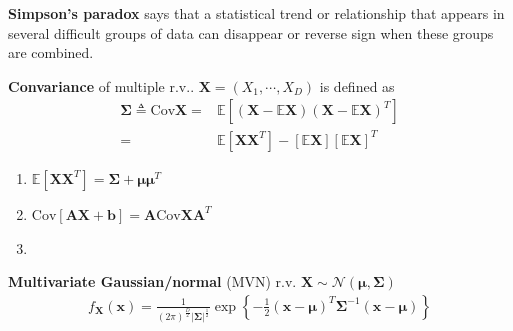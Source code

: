

\textbf{Simpson's paradox} says that a statistical trend or relationship 
that appears in several difficult groups of data can disappear or reverse sign 
when these groups are combined.

\textbf{Convariance} of multiple r.v.. $\bm{X}=(X_1,\cdots,X_D)$ is defined as 
\begin{align}
    \bm{\Sigma}\triangleq\mathrm{Cov}\bm{X}
    =& \mathbb{E}\left[
    (\bm{X}-\mathbb{E}\bm{X})
    (\bm{X}-\mathbb{E}\bm{X})^T
    \right]\\
    =& \mathbb{E}[\bm{XX}^T]-[\mathbb{E}\bm{X}][\mathbb{E}\bm{X}]^T
\end{align}
\begin{enumerate}
    \item $\mathbb{E}[\bm{XX}^T]=\bm{\Sigma}+\bm{\mu}\bm{\mu}^T$
    \item $\mathrm{Cov}[\bm{AX}+\bm{b}]=\bm{A}\mathrm{Cov}\bm{X}\bm{A}^T$
    \item {}
\end{enumerate}

\textbf{Multivariate Gaussian/normal} (MVN) r.v. 
$\bm{X}\sim\mathcal{N}(\bm{\mu},\bm{\Sigma})$
\begin{gather}
    f_{\bm{X}}(\bm{x})
    = \frac{1}{(2\pi)^\frac{D}{2}|\bm{\Sigma}|^\frac{1}{2}}
    \exp\left\{ 
        -\frac{1}{2}
        (\bm{x}-\bm{\mu})^T
        \bm{\Sigma}^{-1}
        (\bm{x}-\bm{\mu}) 
    \right\}
\end{gather}


